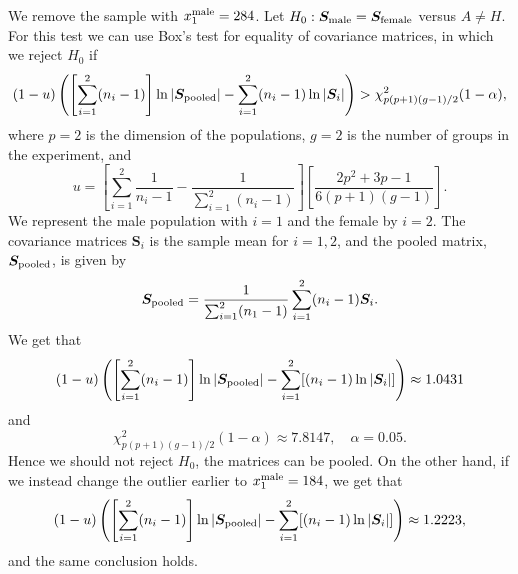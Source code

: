 \message{ !name(examination.tex)}\documentclass[one column]{report}
\renewcommand{\b}[1]{\bm{#1}}
\newcommand{\abs}[1]{
  \left|
    #1
  \right|}
\begin{document}
We remove the sample with $x^{\rm male}_{1} = 284$.
Let $H_{0}: \b S_{\rm male} = \b S_{\rm female}$ versus $A \neq
H$. For this test we can use Box's test for equality of covariance
matrices, in which we reject $H_{0}$ if 
\begin{equation*}\label{eq:boxcorrection}
  (1 - u)
  \left(
    \left[
      \sum_{i=1}^{2}(n_{i} - 1)
    \right]
    \ln \abs{\b S_{\rm pooled}} - \sum_{i=1}^{2}(n_{i}-1) \ln \abs{\b S_{i}}
  \right) > \chi^{2}_{p(p+1)(g-1)/2}(1-\alpha),
\end{equation*}
where $p=2$ is the dimension of the populations, $g = 2$ is the
number of groups in the experiment, and
\begin{equation*}
  u = 
  \left[
    \sum_{i=1}^{2}\frac{1}{n_{i}-1} - \frac{1}{\sum_{i=1}^{2}(n_{i}-1)}
  \right]
  \left[
    \frac{2p^{2} + 3p - 1}{6(p+1)(g-1)}
  \right].
\end{equation*}
We represent the male population with $i=1$ and the female by
$i=2$. The covariance matrices $\b S_{i}$ is the sample mean for $i =
1,2$, and the pooled matrix, $\b S_{\rm pooled}$, is given by 
\begin{equation*}
  \b S_{\rm pooled}=  \frac{1}{\sum_{i=1}^{2}(n_{1} -
    1)}\sum_{i=1}^{2}(n_{i}-1)\b S_{i}  .
\end{equation*}
We get that 
\begin{equation*}
    (1 - u)
  \left(
    \left[
      \sum_{i=1}^{2}(n_{i} - 1)
    \right]
    \ln \abs{\b S_{\rm pooled}} - \sum_{i=1}^{2}[(n_{i}-1) \ln \abs{\b S_{i}}]
  \right) \approx 1.0431
\end{equation*}
and
\begin{equation*}
  \chi^{2}_{p(p+1)(g-1)/2}(1-\alpha) \approx 7.8147 , \quad \alpha =0.05.
\end{equation*}
Hence we should not reject $H_{0}$, the matrices can be pooled. On the
other hand, if we  instead change the outlier earlier to
$x_{1}^{\rm male} = 184$, we get that 
\begin{equation*}
    (1 - u)
  \left(
    \left[
      \sum_{i=1}^{2}(n_{i} - 1)
    \right]
    \ln \abs{\b S_{\rm pooled}} - \sum_{i=1}^{2}[(n_{i}-1) \ln \abs{\b S_{i}}]
  \right) \approx 1.2223,
\end{equation*}
and the same conclusion holds.
\end{document}
